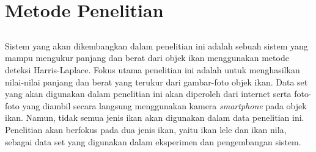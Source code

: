 
\chapter{Metode Penelitian}

\section{}
Sistem yang akan dikembangkan dalam penelitian ini adalah sebuah sistem yang mampu mengukur panjang dan berat dari objek ikan menggunakan metode deteksi Harris-Laplace. 
Fokus utama penelitian ini adalah untuk menghasilkan nilai-nilai panjang dan berat yang terukur dari gambar-foto objek ikan. 
Data set yang akan digunakan dalam penelitian ini akan diperoleh dari internet serta foto-foto yang diambil secara langsung menggunakan kamera \emph{smartphone} pada objek ikan. 
Namun, tidak semua jenis ikan akan digunakan dalam data penelitian ini. 
Penelitian akan berfokus pada dua jenis ikan, yaitu ikan lele dan ikan nila, sebagai data set yang digunakan dalam eksperimen dan pengembangan sistem.

